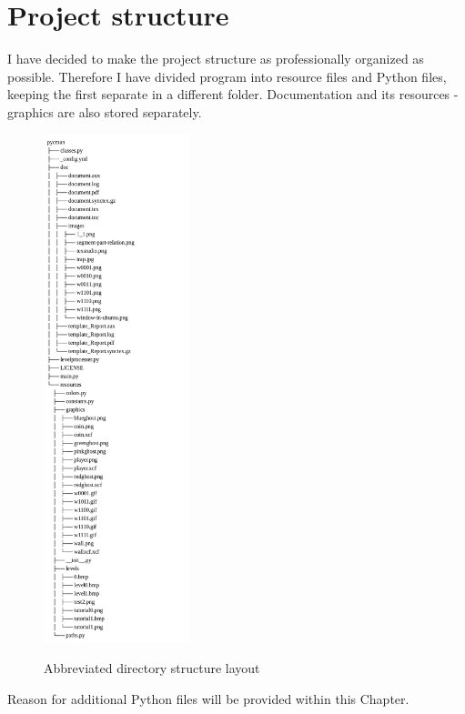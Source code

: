 \documentclass[11pt,a4paper,notitlepage]{report}
\newenvironment{img}{
	\begin{center}
		\begin{figure}[H]
			\begin{center}
			
}{
	\end{center}
		\end{figure}
			\end{center}
}
\begin{document}
		\section{Project structure}
			I have decided to make the project structure as professionally organized as possible. Therefore I have divided program into resource files and Python files, keeping the first separate in a different folder. Documentation and its resources - graphics are also stored separately.
			\begin{img}
				\includegraphics[width=120pt]{images/directory_structure}\\
				\caption{Abbreviated directory structure layout}
			\end{img}
			Reason for additional Python files will be provided within this Chapter.
\end{document}
